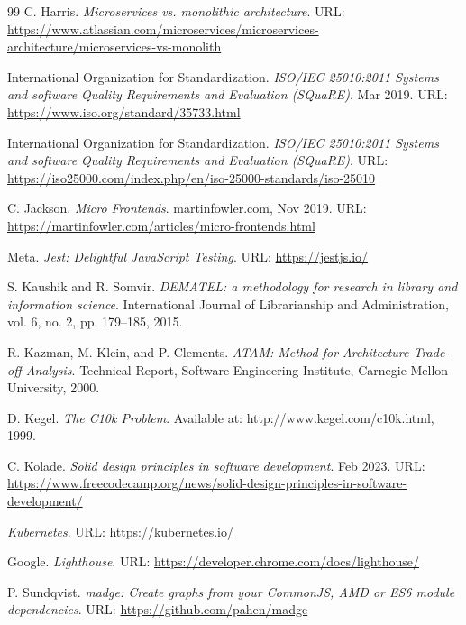 \begin{thebibliography}{99}
    C. Harris.
    \textit{Microservices vs. monolithic architecture}.
    URL: \url{https://www.atlassian.com/microservices/microservices-architecture/microservices-vs-monolith}

    International Organization for Standardization.
    \textit{ISO/IEC 25010:2011 Systems and software Quality Requirements and Evaluation (SQuaRE)}.
    Mar 2019.
    URL: \url{https://www.iso.org/standard/35733.html}

    International Organization for Standardization.
    \textit{ISO/IEC 25010:2011 Systems and software Quality Requirements and Evaluation (SQuaRE)}.
    URL: \url{https://iso25000.com/index.php/en/iso-25000-standards/iso-25010}

    C. Jackson.
    \textit{Micro Frontends}.
    martinfowler.com, Nov 2019.
    URL: \url{https://martinfowler.com/articles/micro-frontends.html}

    Meta.
    \textit{Jest: Delightful JavaScript Testing}.
    URL: \url{https://jestjs.io/}

    S. Kaushik and R. Somvir.
    \textit{DEMATEL: a methodology for research in library and information science}.
    International Journal of Librarianship and Administration, vol. 6, no. 2, pp. 179–185, 2015.

    R. Kazman, M. Klein, and P. Clements.
    \textit{ATAM: Method for Architecture Trade-off Analysis}.
    Technical Report, Software Engineering Institute, Carnegie Mellon University, 2000.
		
    D. Kegel.
    \textit{The C10k Problem}.
    Available at: http://www.kegel.com/c10k.html, 1999.

    C. Kolade.
    \textit{Solid design principles in software development}.
    Feb 2023.
    URL: \url{https://www.freecodecamp.org/news/solid-design-principles-in-software-development/}

    \textit{Kubernetes}.
    URL: \url{https://kubernetes.io/}

    Google.
    \textit{Lighthouse}.
    URL: \url{https://developer.chrome.com/docs/lighthouse/}

    P. Sundqvist.
    \textit{madge: Create graphs from your CommonJS, AMD or ES6 module dependencies}.
    URL: \url{https://github.com/pahen/madge}


\end{thebibliography}
